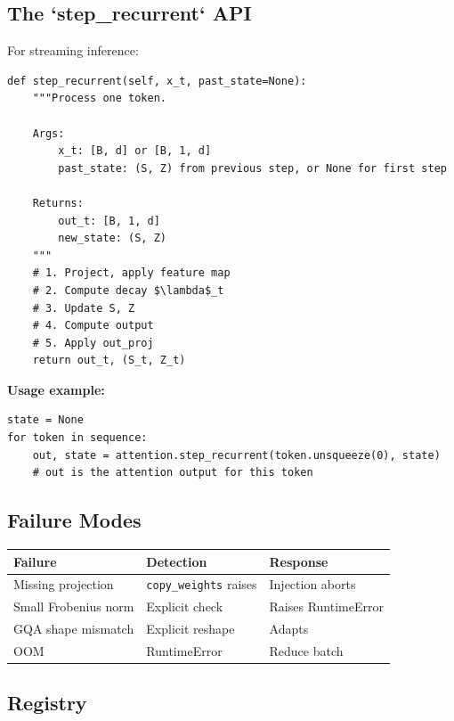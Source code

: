 \subsection{The `step\_recurrent` API}

For streaming inference:

\begin{lstlisting}
def step_recurrent(self, x_t, past_state=None):
    """Process one token.
    
    Args:
        x_t: [B, d] or [B, 1, d]
        past_state: (S, Z) from previous step, or None for first step
    
    Returns:
        out_t: [B, 1, d]
        new_state: (S, Z)
    """
    # 1. Project, apply feature map
    # 2. Compute decay $\lambda$_t
    # 3. Update S, Z
    # 4. Compute output
    # 5. Apply out_proj
    return out_t, (S_t, Z_t)
\end{lstlisting}

\textbf{Usage example:}

\begin{lstlisting}
state = None
for token in sequence:
    out, state = attention.step_recurrent(token.unsqueeze(0), state)
    # out is the attention output for this token
\end{lstlisting}

\subsection{Failure Modes}

\begin{table}[H]
\centering
\small
\begin{tabular}{lll}
\toprule
\textbf{Failure} & \textbf{Detection} & \textbf{Response} \\
\midrule
Missing projection & \texttt{copy\_weights} raises & Injection aborts \\
Small Frobenius norm & Explicit check & Raises RuntimeError \\
GQA shape mismatch & Explicit reshape & Adapts \\
OOM & RuntimeError & Reduce batch \\
\bottomrule
\end{tabular}
\end{table}

\subsection{Registry}

